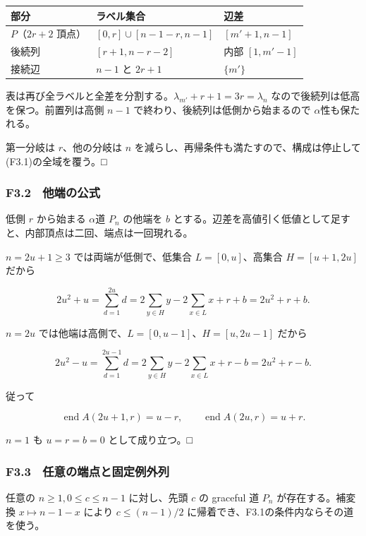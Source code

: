\documentclass[
  10pt,
  a4paper,
]{article}
\begin{document}
\begin{longtable}[]{@{}lll@{}}
\toprule\noalign{}
部分 & ラベル集合 & 辺差 \\
\midrule\noalign{}
\endhead
\bottomrule\noalign{}
\endlastfoot
\(P\)（\(2r+2\) 頂点） & \([0,r]\cup[n-1-r,n-1]\) & \([m'+1,n-1]\) \\
後続列 & \([r+1,n-r-2]\) & 内部 \([1,m'-1]\) \\
接続辺 & \(n-1\) と \(2r+1\) & \(\{m'\}\) \\
\end{longtable}

表は再び全ラベルと全差を分割する。\(\lambda_{m'}+r+1=3r=\lambda_n\)
なので後続列は低高を保つ。前置列は高側 \(n-1\)
で終わり、後続列は低側から始まるので \(\alpha\)性も保たれる。

第一分岐は \(r\)、他の分岐は \(n\)
を減らし、再帰条件も満たすので、構成は停止して(F3.1)の全域を覆う。□

\subsubsection{F3.2　他端の公式}\label{f3.2-ux4ed6ux7aefux306eux516cux5f0f}

低側 \(r\) から始まる \(\alpha\)道 \(P_n\) の他端を \(b\)
とする。辺差を高値引く低値として足すと、内部頂点は二回、端点は一回現れる。

\(n=2u+1\ge3\) では両端が低側で、低集合 \(L=[0,u]\)、高集合
\(H=[u+1,2u]\) だから

\[
2u^2+u=\sum_{d=1}^{2u}d
=2\sum_{y\in H}y-2\sum_{x\in L}x+r+b
=2u^2+r+b.
\]

\(n=2u\) では他端は高側で、\(L=[0,u-1]\)、\(H=[u,2u-1]\) だから

\[
2u^2-u=\sum_{d=1}^{2u-1}d
=2\sum_{y\in H}y-2\sum_{x\in L}x+r-b
=2u^2+r-b.
\]

従って

\[
\operatorname{end} A(2u+1,r)=u-r,\qquad
\operatorname{end} A(2u,r)=u+r.
\tag{F3.2}
\]

\(n=1\) も \(u=r=b=0\) として成り立つ。□

\subsubsection{F3.3　任意の端点と固定例外列}\label{f3.3-ux4efbux610fux306eux7aefux70b9ux3068ux56faux5b9aux4f8bux5916ux5217}

任意の \(n\ge1,0\le c\le n-1\) に対し、先頭 \(c\) の graceful 道 \(P_n\)
が存在する。補変換 \(x\mapsto n-1-x\) により \(c\le(n-1)/2\)
に帰着でき、F3.1の条件内ならその道を使う。
\end{document}
